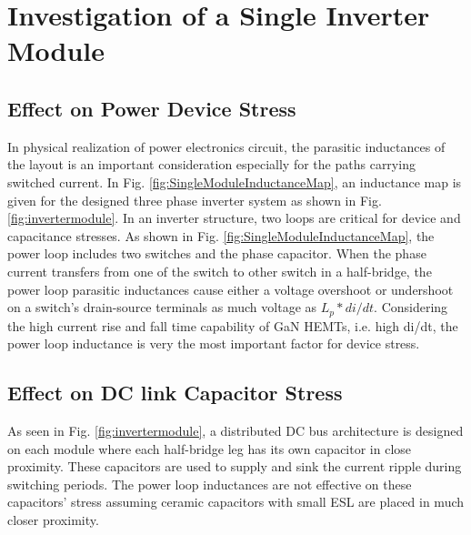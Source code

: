 \section{Investigation of a Single Inverter Module}
\label{chap:curr_driven_rect}

\subsection{Effect on Power Device Stress}

In physical realization of power electronics circuit, the parasitic inductances of the layout is an important consideration especially for the paths carrying switched current. In Fig. \ref{fig:SingleModuleInductanceMap}, an inductance map is given for the designed three phase inverter system as shown in Fig.\ref{fig:invertermodule}. In an inverter structure, two loops are critical for device and capacitance stresses. As shown in Fig. \ref{fig:SingleModuleInductanceMap}, the power loop includes two switches and the phase capacitor. When the phase current transfers from one of the switch to other switch in a half-bridge, the power loop parasitic inductances cause either a voltage overshoot or undershoot on a switch's drain-source terminals as much voltage as $L_p*di/dt$. Considering the high current rise and fall time capability of GaN HEMTs, i.e. high di/dt, the power loop inductance is very the most important factor for device stress.








\subsection{Effect on DC link Capacitor Stress}

As seen in Fig. \ref{fig:invertermodule}, a distributed DC bus architecture is designed on each module where each half-bridge leg has its own capacitor in close proximity. These capacitors are used to supply and sink the current ripple during switching periods. The power loop inductances are not effective on these capacitors' stress assuming ceramic capacitors with small ESL are placed in much closer proximity.


